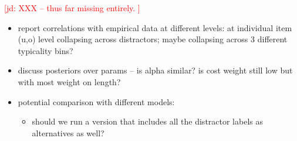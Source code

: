 \documentclass[11pt]{article}
\newcommand{\jd}[1]{\textcolor{Red}{[jd: #1]}}
\newcommand{\sectionref}[1]{Section \ref{#1}}
\begin{document}
%
%




\jd{XXX -- thus far missing entirely. }

\begin{itemize}
	\item report correlations with empirical data at different levels: at individual item (u,o) level collapsing across distractors; maybe collapsing across 3 different typicality bins?
	\item discuss posteriors over params -- is alpha similar? is cost weight still low but with most weight on length? 
	\item potential comparison with different models:
	\begin{itemize}
		\item should we run a version that includes all the distractor labels as alternatives as well?
	\end{itemize}
\end{itemize}

\end{document}
